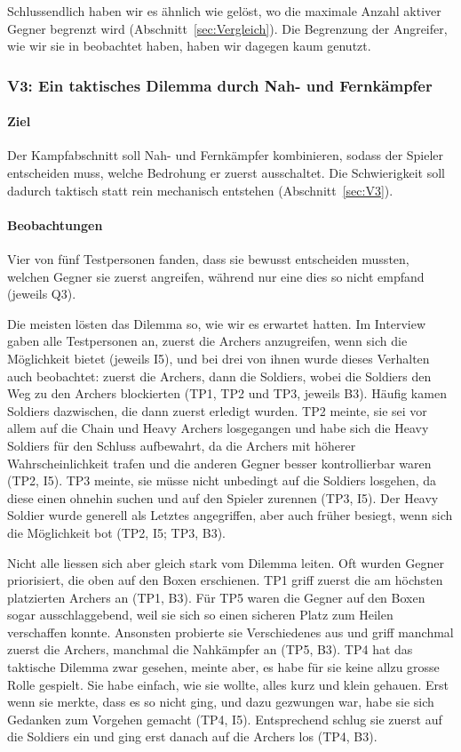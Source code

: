 \documentclass[../Main.tex]{subfiles}
\begin{document}
Schlussendlich haben wir es ähnlich wie  gelöst, wo die maximale Anzahl aktiver Gegner begrenzt wird (Abschnitt~\ref{sec:Vergleich}). Die Begrenzung der Angreifer, wie wir sie in  beobachtet haben, haben wir dagegen kaum genutzt.

\subsubsection{V3: Ein taktisches Dilemma durch Nah- und Fernkämpfer}

\paragraph{Ziel}
Der Kampfabschnitt soll Nah- und Fernkämpfer kombinieren, sodass der Spieler entscheiden muss, welche Bedrohung er zuerst ausschaltet. Die Schwierigkeit soll dadurch taktisch statt rein mechanisch entstehen (Abschnitt~\ref{sec:V3}).

\paragraph{Beobachtungen}
Vier von fünf Testpersonen fanden, dass sie bewusst entscheiden mussten, welchen Gegner sie zuerst angreifen, während nur eine dies so nicht empfand (jeweils Q3).

Die meisten lösten das Dilemma so, wie wir es erwartet hatten. Im Interview gaben alle Testpersonen an, zuerst die Archers anzugreifen, wenn sich die Möglichkeit bietet (jeweils I5), und bei drei von ihnen wurde dieses Verhalten auch beobachtet: zuerst die Archers, dann die Soldiers, wobei die Soldiers den Weg zu den Archers blockierten (TP1, TP2 und TP3, jeweils B3). Häufig kamen Soldiers dazwischen, die dann zuerst erledigt wurden. TP2 meinte, sie sei vor allem auf die Chain und Heavy Archers losgegangen und habe sich die Heavy Soldiers für den Schluss aufbewahrt, da die Archers mit höherer Wahrscheinlichkeit trafen und die anderen Gegner besser kontrollierbar waren (TP2, I5). TP3 meinte, sie müsse nicht unbedingt auf die Soldiers losgehen, da diese einen ohnehin suchen und auf den Spieler zurennen (TP3, I5). Der Heavy Soldier wurde generell als Letztes angegriffen, aber auch früher besiegt, wenn sich die Möglichkeit bot (TP2, I5; TP3, B3).

Nicht alle liessen sich aber gleich stark vom Dilemma leiten. Oft wurden Gegner priorisiert, die oben auf den Boxen erschienen. TP1 griff zuerst die am höchsten platzierten Archers an (TP1, B3). Für TP5 waren die Gegner auf den Boxen sogar ausschlaggebend, weil sie sich so einen sicheren Platz zum Heilen verschaffen konnte. Ansonsten probierte sie Verschiedenes aus und griff manchmal zuerst die Archers, manchmal die Nahkämpfer an (TP5, B3). TP4 hat das taktische Dilemma zwar gesehen, meinte aber, es habe für sie keine allzu grosse Rolle gespielt. Sie habe einfach, wie sie wollte, alles kurz und klein gehauen. Erst wenn sie merkte, dass es so nicht ging, und dazu gezwungen war, habe sie sich Gedanken zum Vorgehen gemacht (TP4, I5). Entsprechend schlug sie zuerst auf die Soldiers ein und ging erst danach auf die Archers los (TP4, B3).
\end{document}
